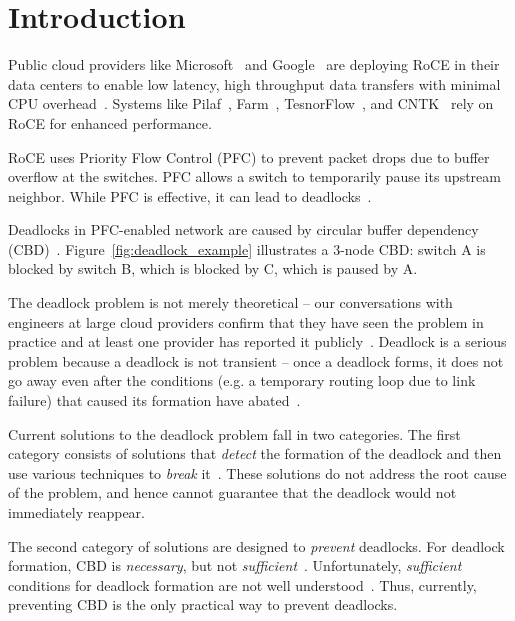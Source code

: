 \section{Introduction}
\label{sec:intro}

Public cloud providers like Microsoft~\cite{dcqcn} and Google~\cite{timely} are
deploying RoCE in their data centers to enable low latency, high throughput data
transfers with minimal CPU overhead~\cite{dcqcn}. Systems like
Pilaf~\cite{pilaf}, Farm~\cite{farm}, TesnorFlow~\cite{tensorflow}, and
CNTK~\cite{cntk} rely on RoCE for enhanced performance.

RoCE uses Priority Flow Control (PFC) to prevent packet drops due to buffer
overflow at the switches. PFC allows a switch to temporarily pause its upstream
neighbor. While PFC is effective, it can lead to
deadlocks~\cite{rdmaatscale,tcpbolt,hu2016deadlocks}.

Deadlocks in PFC-enabled network are caused by circular buffer dependency
(CBD)~\cite{hu2016deadlocks}. Figure~\ref{fig:deadlock_example}
illustrates a 3-node CBD: switch A is blocked by switch B, which is blocked by
C, which is paused by A. 

The deadlock problem is not merely theoretical -- our conversations with
engineers at large cloud providers confirm that they have seen the problem in
practice and at least one provider has reported it publicly~\cite{rdmaatscale}.
Deadlock is a serious problem because a deadlock is not transient -- once a
deadlock forms, it does not go away even after the conditions (e.g. a temporary
routing loop due to link failure) that caused its formation have
abated~\cite{rdmaatscale}.

Current solutions to the deadlock problem fall in two categories. The first
category consists of solutions that {\em detect} the formation of the deadlock
and then use various techniques to {\em break} it~\cite{shpiner2016unlocking}.
These solutions do not address the root cause of the problem, and hence cannot
guarantee that the deadlock would not immediately reappear. 

The second category of solutions are designed to {\em prevent} deadlocks.  For
deadlock formation, CBD is {\em necessary}, but not {\em
sufficient}~\cite{hu2016deadlocks}. Unfortunately, {\em sufficient} conditions
for deadlock formation are not well understood~\cite{hu2016deadlocks}. Thus,
currently, preventing CBD is the only practical way to prevent deadlocks. 

